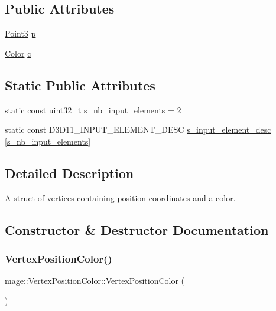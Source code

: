 \subsection*{Public Attributes}
\begin{DoxyCompactItemize}
\item 
\hyperlink{structmage_1_1_point3}{Point3} \hyperlink{structmage_1_1_vertex_position_color_afe40a78afb8e13e742d93d5092b1a614}{p}
\item 
\hyperlink{structmage_1_1_color}{Color} \hyperlink{structmage_1_1_vertex_position_color_a4a9e50e66f73e93a9a529c0c940e2458}{c}
\end{DoxyCompactItemize}
\subsection*{Static Public Attributes}
\begin{DoxyCompactItemize}
\item 
static const uint32\+\_\+t \hyperlink{structmage_1_1_vertex_position_color_a480c2767efdb73c09ebf55313e4b29c9}{s\+\_\+nb\+\_\+input\+\_\+elements} = 2
\item 
static const D3\+D11\+\_\+\+I\+N\+P\+U\+T\+\_\+\+E\+L\+E\+M\+E\+N\+T\+\_\+\+D\+E\+SC \hyperlink{structmage_1_1_vertex_position_color_a0cc09950718850b64339c5fd5130ff9a}{s\+\_\+input\+\_\+element\+\_\+desc} \mbox{[}\hyperlink{structmage_1_1_vertex_position_color_a480c2767efdb73c09ebf55313e4b29c9}{s\+\_\+nb\+\_\+input\+\_\+elements}\mbox{]}
\end{DoxyCompactItemize}


\subsection{Detailed Description}
A struct of vertices containing position coordinates and a color. 

\subsection{Constructor \& Destructor Documentation}
\hypertarget{structmage_1_1_vertex_position_color_a9346fd83bc634a105b3d81231c42136b}{}\label{structmage_1_1_vertex_position_color_a9346fd83bc634a105b3d81231c42136b} 
\subsubsection{\texorpdfstring{Vertex\+Position\+Color()}{VertexPositionColor()}\hspace{0.1cm}{\footnotesize\ttfamily [1/4]}}
{\footnotesize\ttfamily mage\+::\+Vertex\+Position\+Color\+::\+Vertex\+Position\+Color (\begin{DoxyParamCaption}{ }\end{DoxyParamCaption})\hspace{0.3cm}{\ttfamily [default]}}

